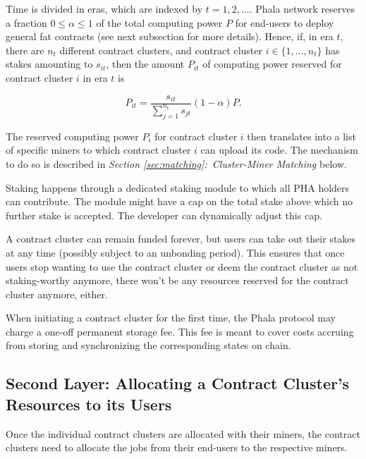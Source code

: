 \documentclass[11pt, a4paper, twocolumn]{article}
\begin{document}
Time is divided in eras, which are indexed by $t = 1,2,...$. Phala network reserves a fraction $0 \leq \alpha \leq 1$ of the total computing power $P$ for end-users to deploy general fat contracts (see next subsection for more details). Hence, if, in era $t$, there are $n_t$ different contract clusters, and contract cluster $i \in \{1,...,n_t\}$ has stakes amounting to $s_{it}$, then the amount $P_{it}$ of computing power reserved for contract cluster $i$ in era $t$ is%

\begin{equation*} P_{it} = \frac{s_{it}}{\sum_{j=1}^{n_t} s_{jt}} (1-\alpha)P.\end{equation*}

The reserved computing power $P_i$ for contract cluster $i$ then translates into a list of specific miners to which contract cluster $i$ can upload its code. The mechanism to do so is described in \textit{Section \ref{sec:matching}:~Cluster-Miner Matching} below.

Staking happens through a dedicated staking module to which all PHA holders can contribute. The module might have a cap on the total stake above which no further stake is accepted. The developer can dynamically adjust this cap. 

A contract cluster can remain funded forever, but users can take out their stakes at any time (possibly subject to an unbonding period). This ensures that once users stop wanting to use the contract cluster or deem the contract cluster as not staking-worthy anymore, there won't be any resources reserved for the contract cluster anymore, either.

When initiating a contract cluster for the first time, the Phala protocol may charge a one-off permanent storage fee. This fee is meant to cover costs accruing from storing and synchronizing the corresponding states on chain.  

\subsection{Second Layer: Allocating a Contract Cluster's Resources to its Users} 
Once the individual contract clusters are allocated with their miners, the contract clusters need to allocate the jobs from their end-users to the respective miners. 
\end{document}
